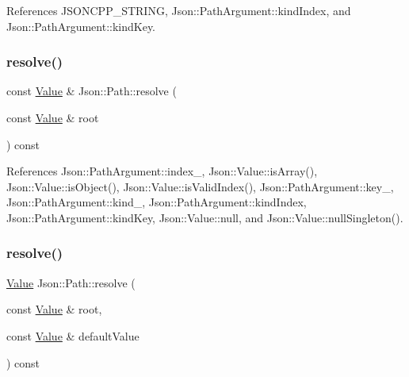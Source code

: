 References J\+S\+O\+N\+C\+P\+P\+\_\+\+S\+T\+R\+I\+NG, Json\+::\+Path\+Argument\+::kind\+Index, and Json\+::\+Path\+Argument\+::kind\+Key.

\mbox{\label{classJson_1_1Path_ad1abdc54d2e03fc0e9436c3b9fd55a33_ad1abdc54d2e03fc0e9436c3b9fd55a33}} 
\subsubsection{\texorpdfstring{resolve()}{resolve()}\hspace{0.1cm}{\footnotesize\ttfamily [1/2]}}
{\footnotesize\ttfamily const \hyperlink{classJson_1_1Value}{Value} \& Json\+::\+Path\+::resolve (\begin{DoxyParamCaption}\item[{const \hyperlink{classJson_1_1Value}{Value} \&}]{root }\end{DoxyParamCaption}) const}



References Json\+::\+Path\+Argument\+::index\+\_\+, Json\+::\+Value\+::is\+Array(), Json\+::\+Value\+::is\+Object(), Json\+::\+Value\+::is\+Valid\+Index(), Json\+::\+Path\+Argument\+::key\+\_\+, Json\+::\+Path\+Argument\+::kind\+\_\+, Json\+::\+Path\+Argument\+::kind\+Index, Json\+::\+Path\+Argument\+::kind\+Key, Json\+::\+Value\+::null, and Json\+::\+Value\+::null\+Singleton().

\mbox{\label{classJson_1_1Path_ab65ab001ccdbc6f8b5f123da58b92539_ab65ab001ccdbc6f8b5f123da58b92539}} 
\subsubsection{\texorpdfstring{resolve()}{resolve()}\hspace{0.1cm}{\footnotesize\ttfamily [2/2]}}
{\footnotesize\ttfamily \hyperlink{classJson_1_1Value}{Value} Json\+::\+Path\+::resolve (\begin{DoxyParamCaption}\item[{const \hyperlink{classJson_1_1Value}{Value} \&}]{root,  }\item[{const \hyperlink{classJson_1_1Value}{Value} \&}]{default\+Value }\end{DoxyParamCaption}) const}



